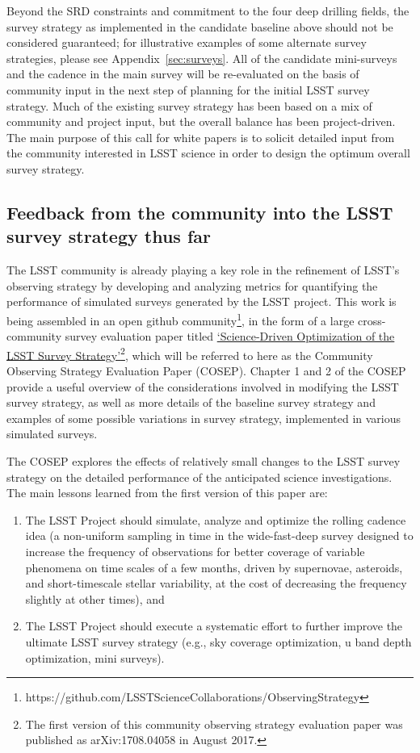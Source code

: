\documentclass[DM,lsstdraft,toc,usenatbib]{lsstdoc}
\begin{document}
Beyond the SRD constraints and commitment to the four deep drilling fields, the survey strategy as implemented in the candidate baseline 
above should not be considered guaranteed; for illustrative examples of some alternate survey strategies, please see Appendix~\ref{sec:surveys}.
All of the candidate mini-surveys and the cadence in the main survey will be re-evaluated on the basis of community input in the next 
step of planning for the initial LSST survey strategy. Much of the existing survey strategy 
has been based on a mix of community and project input, but the overall balance has been project-driven. 
The main purpose of this call for white papers is to solicit detailed input from the community interested in 
LSST science in order to design the optimum overall survey strategy. 


\subsection{Feedback from the community into the LSST survey strategy thus far}

The LSST community is already playing a key role in the refinement of LSST's observing strategy 
by developing and analyzing metrics for quantifying the performance of simulated surveys generated by
the LSST project.  This work is being assembled in an open github community\footnote{
https://github.com/LSSTScienceCollaborations/ObservingStrategy}, 
in the form of a large cross-community survey evaluation paper
titled \href{http://ls.st/9fw}{`Science-Driven Optimization of the LSST Survey Strategy'}\footnote{The first 
version of this community observing strategy evaluation paper was published as arXiv:1708.04058 in August 2017.},
which will be referred to here as the Community Observing Strategy Evaluation Paper (COSEP). 
Chapter 1 and 2 of the COSEP provide a useful overview of the considerations involved in 
modifying the LSST survey strategy, as well as more details of the baseline survey strategy and 
examples of some possible variations in survey strategy, implemented in various simulated surveys.

The COSEP explores the effects of relatively small changes to the LSST survey strategy
on the detailed performance of the anticipated science investigations. The main lessons 
learned from the first version of this paper are: 
\begin{enumerate} 
\item The LSST Project should simulate, analyze and optimize the rolling cadence idea
(a non-uniform sampling in time in the wide-fast-deep survey designed to increase the frequency of 
observations for better coverage of variable phenomena on time scales of a few months, driven 
by supernovae, asteroids, and short-timescale stellar variability, at the cost of decreasing the 
frequency slightly at other times), and 
\item The LSST Project should execute a systematic effort to further improve the ultimate
LSST survey strategy (e.g., sky coverage optimization, u band depth optimization, mini surveys). 
\end{enumerate} 
\end{document}
